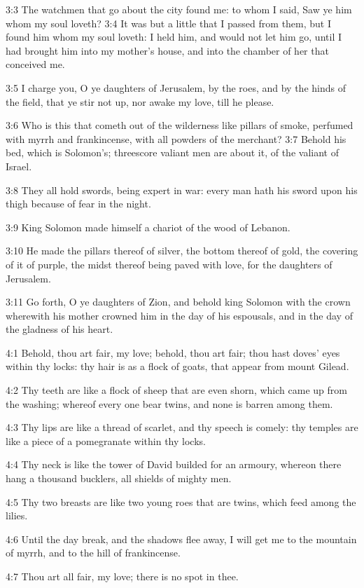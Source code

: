 3:3 The watchmen that go about the city found me: to whom I said, Saw ye him whom my soul loveth?  3:4 It was but a little that I passed from them, but I found him whom my soul loveth: I held him, and would not let him go, until I had brought him into my mother's house, and into the chamber of her that conceived me.

3:5 I charge you, O ye daughters of Jerusalem, by the roes, and by the hinds of the field, that ye stir not up, nor awake my love, till he please.

3:6 Who is this that cometh out of the wilderness like pillars of smoke, perfumed with myrrh and frankincense, with all powders of the merchant?  3:7 Behold his bed, which is Solomon's; threescore valiant men are about it, of the valiant of Israel.

3:8 They all hold swords, being expert in war: every man hath his sword upon his thigh because of fear in the night.

3:9 King Solomon made himself a chariot of the wood of Lebanon.

3:10 He made the pillars thereof of silver, the bottom thereof of gold, the covering of it of purple, the midst thereof being paved with love, for the daughters of Jerusalem.

3:11 Go forth, O ye daughters of Zion, and behold king Solomon with the crown wherewith his mother crowned him in the day of his espousals, and in the day of the gladness of his heart.

4:1 Behold, thou art fair, my love; behold, thou art fair; thou hast doves' eyes within thy locks: thy hair is as a flock of goats, that appear from mount Gilead.

4:2 Thy teeth are like a flock of sheep that are even shorn, which came up from the washing; whereof every one bear twins, and none is barren among them.

4:3 Thy lips are like a thread of scarlet, and thy speech is comely: thy temples are like a piece of a pomegranate within thy locks.

4:4 Thy neck is like the tower of David builded for an armoury, whereon there hang a thousand bucklers, all shields of mighty men.

4:5 Thy two breasts are like two young roes that are twins, which feed among the lilies.

4:6 Until the day break, and the shadows flee away, I will get me to the mountain of myrrh, and to the hill of frankincense.

4:7 Thou art all fair, my love; there is no spot in thee.

